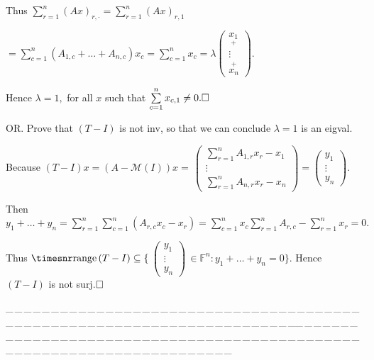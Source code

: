 \documentclass[a4paper, 11pt, UTF8]{article}
\def\range{{\timesnr\textup{range}}\,}
\def\Mt{\mathcal{M}}
\def\Fbb{{\mathbb{F}}}
\def\Hb{\quad\hspace{8.7pt}}
\def\Or{\large O{\footnotesize R.} }
\def\ProblemEnding{{\tiny \_\,\_\,\_\,\_\,\_\,\_\,\_\,\_\,\_\,\_\,\_\,\_\,\_\,\_\,\_\,\_\,\_\,\_\,\_\,\_\,\_\,\_\,\_\,\_\,\_\,\_\,\_\,\_\,\_\,\_\,\_\,\_\,\_\,\_\,\_\,\_\,\_\,\_\,\_\,\_\,\_\,\_\,\_\,\_\,\_\,\_\,\_\,\_\,\_\,\_\,\_\,\_\,\_\,\_\,\_\,\_\,\_\,\_\,\_\,\_\,\_\,\_\,\_\,\_\,\_\,\_\,\_\,\_\,\_\,\_\,\_\_\,\_\,\_\,\_\,\_\,\_\,\_\,\_\,\_\,\_\,\_\,\_\,\_\,\_\,\_\,\_\,\_\,\_\,\_\,\_\,\_\,\_\,\_\,\_\,\_\,\_\,\_\,\_\,\_\,\_\,\_\,\_\,\_\,\_\,\_\,\_\,\_\,\_\,\_\,\_\,\_\,\_\,\_\,\_\,\_\,\_\,\_\,\_\,\_\,\_\,\_\,\_\,\_\,\_\,\_\,\_\,\_\,\_\,\_\,\_\,\_\,\_\,\_\,\_\,\_\,\_\,\_\,\_\,\_\,\_\,\_}}
\begin{document}
\begin{large}
Thus $\sum\limits_{r=1}^n (Ax)_{r,\cdot}=\sum\limits_{r=1}^n (Ax)_{r,1}$\par\qquad\qquad\qquad\qquad\quad
$=\sum\limits_{c=1}^n(A_{1,c}+\dots+A_{n,c})x_c=\sum\limits_{c=1}^n x_c=\lambda${\small$\begin{pmatrix}
\underset{+}{x_1}\\ \vdots\\ \overset{+}{x_n}
\end{pmatrix}.$}\par\quad\Hb
Hence $\lambda=1,$ for all $x$ such that $\sum\limits_{c=1}^n x_{c,1}\neq 0.\hfill\square$\par\vspace{6pt}\quad\Hb
\Or Prove that $(T-I)$ is not inv, so that we can conclude $\lambda=1$ is an eigval.\par\quad\Hb
Because $(T-I)x=\left(A-\Mt(I)\right)x=\,${\small$\begin{pmatrix} \sum\limits_{r=1}^n A_{1,r}x_r-x_1\\ \vdots\\ \sum\limits_{r=1}^n A_{n,r}x_r-x_n\end{pmatrix}=\begin{pmatrix} y_1\\ \vdots\\ y_n\end{pmatrix}.$}\par\quad\Hb
Then $y_1+\dots+y_n=\sum\limits_{r=1}^n\sum\limits_{c=1}^n (A_{r,c}x_c-x_r)=\sum\limits_{c=1}^n x_c\sum\limits_{r=1}^n A_{r,c}-\sum\limits_{r=1}^n x_r=0.$\par\vspace{6pt}\quad\Hb
Thus $\range(T-I)\subseteq\{\,${\small$\begin{pmatrix}
y_1 \\ \vdots \\ y_n\end{pmatrix}$}$\,\in\Fbb^n:y_1+\dots+y_n=0\}.$ Hence $(T-I)$ is not surj.$\hfill\square$\par
\ProblemEnding\par


\end{large}
\end{document}
